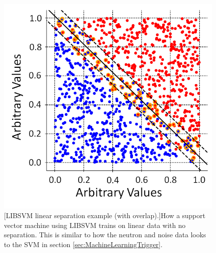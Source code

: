 \begin{figure}[!h]
\begin{minipage}{.45\textwidth}
  \includegraphics[width=\linewidth]{Chapter4/Figs/adjustedSvmPlots/adjusted_LinNoSepExample.png}
  [LIBSVM linear separation example (with overlap).]{How a support vector machine using LIBSVM trains on linear data with no separation. This is similar to how the neutron and noise data looks to the SVM in section \ref{sec:MachineLearningTrigger}.}
  \label{fig:LinNoSepExample}
\end{minipage}
\end{figure}

